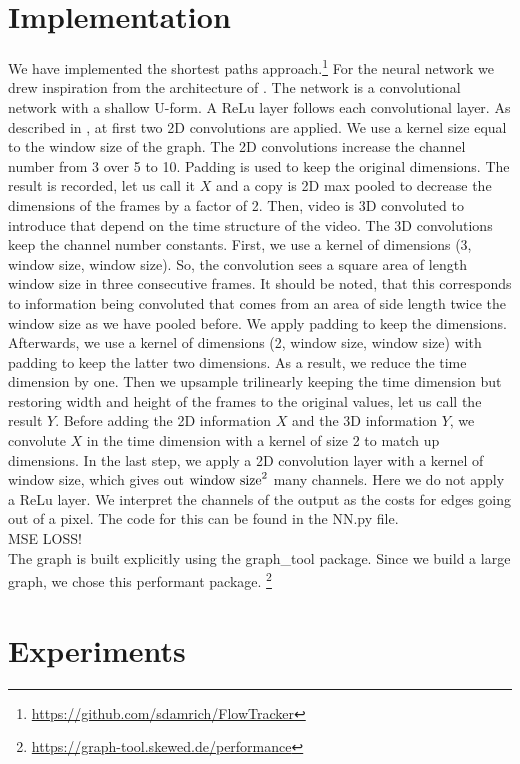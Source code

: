 \documentclass{article}
\begin{document}
\section{Implementation}
We have implemented the shortest paths approach.\footnote{\url{https://github.com/sdamrich/FlowTracker}}  For the neural network we drew inspiration from the architecture of \cite{Lee17}. The network is a convolutional network with a shallow U-form. A ReLu layer follows each convolutional layer. As described in \cite{Lee17}, at first two 2D convolutions are applied. We use a kernel size equal to the window size of the graph. The 2D convolutions increase the channel number from 3 over 5 to 10. Padding is used to keep the original dimensions. The result is recorded, let us call it $X$ and a copy is 2D max pooled to decrease the dimensions of the frames by a factor of 2. Then, video is 3D convoluted to introduce that depend on the time structure of the video. The 3D convolutions keep the channel number constants.  First, we use a kernel of dimensions (3, window size, window size). So, the convolution sees a square area of length window size in three consecutive frames. It should be noted, that this corresponds to information being convoluted that comes from an area of side length twice the window size as we have pooled before. We apply padding to keep the dimensions. Afterwards, we use a kernel of dimensions (2, window size, window size) with padding to keep the latter two dimensions. As a result, we reduce the time dimension by one. Then we upsample trilinearly keeping the time dimension but restoring width and height of the frames to the original values, let us call the result $Y$. Before adding the 2D information $X$ and the 3D information $Y$, we convolute $X$ in the time dimension with a kernel of size 2 to match up dimensions. 
In the last step, we apply a 2D convolution layer with a kernel of window size, which gives out $\textnormal{window size}^2$ many channels. Here we do not apply a ReLu layer. We interpret the channels of the output as the costs for edges going out of a pixel. The code for this can be found in the NN.py file.\\ 

MSE LOSS!
\\
The graph is built explicitly using the 
graph\_tool package. Since we build a large graph, we chose this performant package. \footnote{\url{https://graph-tool.skewed.de/performance}}


\section{Experiments}
\end{document}
